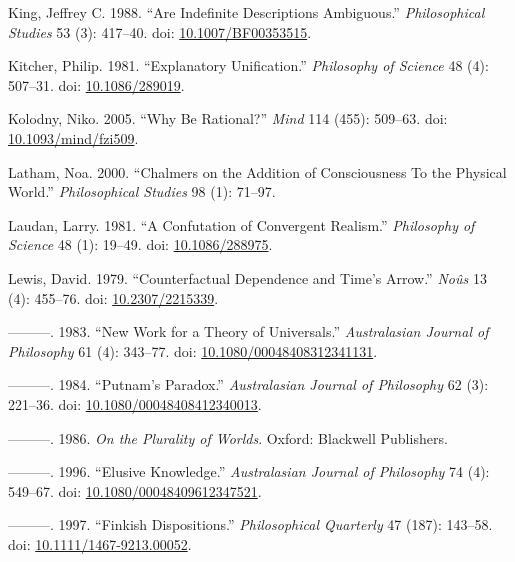 \documentclass[
  11pt,
  letterpaper,
  DIV=11,
  numbers=noendperiod,
  twoside]{scrartcl}
\newlength{\cslhangindent}
\newenvironment{CSLReferences}[2] %
 {\begin{list}{}{%
  \setlength{\itemindent}{0pt}
  \setlength{\leftmargin}{0pt}
  \setlength{\parsep}{0pt}
  \ifodd #1
   \setlength{\leftmargin}{\cslhangindent}
   \setlength{\itemindent}{-1\cslhangindent}
  \fi
  \setlength{\itemsep}{#2\baselineskip}}}
 {\end{list}}
\begin{document}
\begin{CSLReferences}{1}{0}
King, Jeffrey C. 1988. {``Are Indefinite Descriptions Ambiguous.''}
\emph{Philosophical Studies} 53 (3): 417--40. doi:
\href{https://doi.org/10.1007/BF00353515}{10.1007/BF00353515}.

Kitcher, Philip. 1981. {``Explanatory Unification.''} \emph{Philosophy
of Science} 48 (4): 507--31. doi:
\href{https://doi.org/10.1086/289019}{10.1086/289019}.

Kolodny, Niko. 2005. {``Why Be Rational?''} \emph{Mind} 114 (455):
509--63. doi:
\href{https://doi.org/10.1093/mind/fzi509}{10.1093/mind/fzi509}.

Latham, Noa. 2000. {``Chalmers on the Addition of Consciousness To the
Physical World.''} \emph{Philosophical Studies} 98 (1): 71--97.

Laudan, Larry. 1981. {``A Confutation of Convergent Realism.''}
\emph{Philosophy of Science} 48 (1): 19--49. doi:
\href{https://doi.org/10.1086/288975}{10.1086/288975}.

Lewis, David. 1979. {``Counterfactual Dependence and Time's Arrow.''}
\emph{Noûs} 13 (4): 455--76. doi:
\href{https://doi.org/10.2307/2215339}{10.2307/2215339}.

---------. 1983. {``New Work for a Theory of Universals.''}
\emph{Australasian Journal of Philosophy} 61 (4): 343--77. doi:
\href{https://doi.org/10.1080/00048408312341131}{10.1080/00048408312341131}.

---------. 1984. {``Putnam's Paradox.''} \emph{Australasian Journal of
Philosophy} 62 (3): 221--36. doi:
\href{https://doi.org/10.1080/00048408412340013}{10.1080/00048408412340013}.

---------. 1986. \emph{On the Plurality of Worlds}. Oxford: Blackwell
Publishers.

---------. 1996. {``Elusive Knowledge.''} \emph{Australasian Journal of
Philosophy} 74 (4): 549--67. doi:
\href{https://doi.org/10.1080/00048409612347521}{10.1080/00048409612347521}.

---------. 1997. {``Finkish Dispositions.''} \emph{Philosophical
Quarterly} 47 (187): 143--58. doi:
\href{https://doi.org/10.1111/1467-9213.00052}{10.1111/1467-9213.00052}.


\end{CSLReferences}
\end{document}
